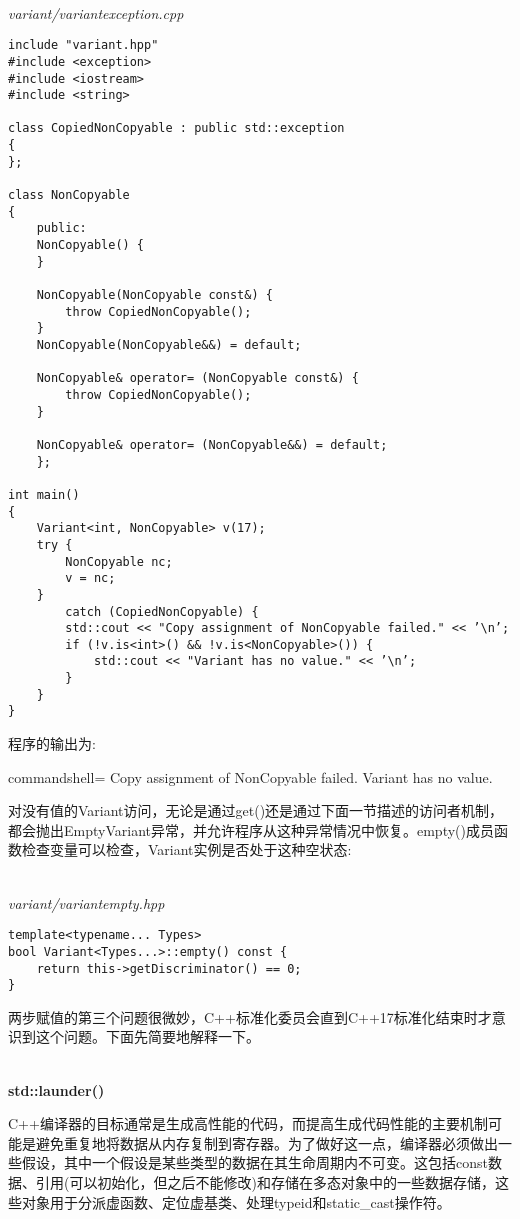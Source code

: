 \hspace*{\fill} \\ %
\noindent
\textit{variant/variantexception.cpp}
\begin{lstlisting}[style=styleCXX]
include "variant.hpp"
#include <exception>
#include <iostream>
#include <string>

class CopiedNonCopyable : public std::exception
{
};

class NonCopyable
{
	public:
	NonCopyable() {
	}

	NonCopyable(NonCopyable const&) {
		throw CopiedNonCopyable();
	}
	NonCopyable(NonCopyable&&) = default;
	
	NonCopyable& operator= (NonCopyable const&) {
		throw CopiedNonCopyable();
	}

	NonCopyable& operator= (NonCopyable&&) = default;
	};

int main()
{
	Variant<int, NonCopyable> v(17);
	try {
		NonCopyable nc;
		v = nc;
	}
		catch (CopiedNonCopyable) {
		std::cout << "Copy assignment of NonCopyable failed." << ’\n’;
		if (!v.is<int>() && !v.is<NonCopyable>()) {
			std::cout << "Variant has no value." << ’\n’;
		}
	}
}
\end{lstlisting}

程序的输出为:

\begin{tcblisting}{commandshell={}}
Copy assignment of NonCopyable failed.
Variant has no value.
\end{tcblisting}

对没有值的Variant访问，无论是通过get()还是通过下面一节描述的访问者机制，都会抛出EmptyVariant异常，并允许程序从这种异常情况中恢复。empty()成员函数检查变量可以检查，Variant实例是否处于这种空状态:

\hspace*{\fill} \\ %
\noindent
\textit{variant/variantempty.hpp}
\begin{lstlisting}[style=styleCXX]
template<typename... Types>
bool Variant<Types...>::empty() const {
	return this->getDiscriminator() == 0;
}
\end{lstlisting}

两步赋值的第三个问题很微妙，C++标准化委员会直到C++17标准化结束时才意识到这个问题。下面先简要地解释一下。

\hspace*{\fill} \\ %
\noindent
\textbf{std::launder()}

C++编译器的目标通常是生成高性能的代码，而提高生成代码性能的主要机制可能是避免重复地将数据从内存复制到寄存器。为了做好这一点，编译器必须做出一些假设，其中一个假设是某些类型的数据在其生命周期内不可变。这包括const数据、引用(可以初始化，但之后不能修改)和存储在多态对象中的一些数据存储，这些对象用于分派虚函数、定位虚基类、处理typeid和static\_cast操作符。

